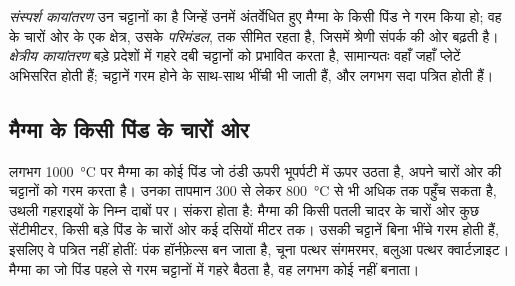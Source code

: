 \begin{definition}\label{def:g12:metamorphic-rocks:contact-regional}
\emph{संस्पर्श कायांतरण} उन चट्टानों का  है
जिन्हें उनमें अंतर्वेधित हुए मैग्मा के किसी पिंड ने गरम किया हो; वह
 के चारों ओर के एक क्षेत्र, उसके \emph{परिमंडल}, तक सीमित रहता है, जिसमें
श्रेणी संपर्क की ओर बढ़ती है। \emph{क्षेत्रीय
कायांतरण} बड़े प्रदेशों में गहरे दबी चट्टानों को
प्रभावित करता है, सामान्यतः वहाँ जहाँ प्लेटें अभिसरित होती हैं; चट्टानें गरम होने के साथ-साथ
भींची भी जाती हैं, और लगभग सदा पत्रित होती हैं।
\end{definition}

\subsection{मैग्मा के किसी पिंड के चारों ओर}

लगभग \qty{1000}{\celsius} पर मैग्मा का कोई पिंड जो ठंडी ऊपरी
भूपर्पटी में ऊपर उठता है, अपने चारों ओर की चट्टानों को गरम करता है। उनका तापमान 300 से लेकर
\qty{800}{\celsius} से भी अधिक तक पहुँच सकता है, उथली गहराइयों के निम्न दाबों पर।
 संकरा होता है: मैग्मा की किसी पतली चादर के चारों ओर कुछ सेंटीमीटर, किसी बड़े पिंड के चारों ओर
कई दसियों मीटर तक। उसकी चट्टानें बिना
भींचे गरम होती हैं, इसलिए वे पत्रित नहीं होतीं: पंक हॉर्नफ़ेल्स बन जाता है, चूना पत्थर
संगमरमर, बलुआ पत्थर क्वार्टज़ाइट। मैग्मा का जो पिंड पहले से गरम चट्टानों में गहरे
बैठता है, वह लगभग कोई  नहीं बनाता।

